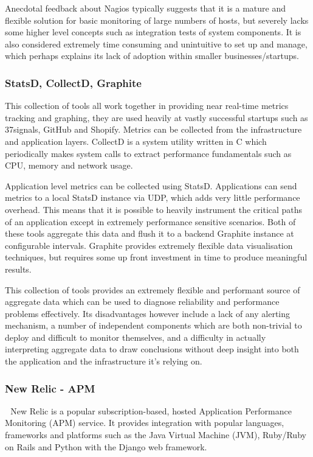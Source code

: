 \documentclass{cshonours}
\begin{document}
Anecdotal feedback about Nagios typically suggests that it is a mature and flexible solution for basic monitoring of large numbers of hosts, but severely lacks some higher level concepts such as integration tests of system components. It is also considered extremely time consuming and unintuitive to set up and manage, which perhaps explains its lack of adoption within smaller businesses/startups.

\subsubsection{StatsD, CollectD, Graphite}

This collection of tools all work together in providing near real-time metrics tracking and graphing, they are used heavily at vastly successful startups such as 37signals, GitHub and Shopify. Metrics can be collected from the infrastructure and application layers. 
CollectD is a system utility written in C which periodically makes system calls to extract performance fundamentals such as CPU, memory and network usage. 

Application level metrics can be collected using StatsD. Applications can send metrics to a local StatsD instance via UDP, which adds very little performance overhead. This means that it is possible to heavily instrument the critical paths of an application except in extremely performance sensitive scenarios. Both of these tools aggregate this data and flush it to a backend Graphite instance at configurable intervals. Graphite provides extremely flexible data visualisation techniques, but requires some up front investment in time to produce meaningful results.

This collection of tools provides an extremely flexible and performant source of aggregate data which can be used to diagnose reliability and performance problems effectively. Its disadvantages however include a lack of any alerting mechanism, a number of independent components which are both non-trivial to deploy and difficult to monitor themselves, and a difficulty in actually interpreting aggregate data to draw conclusions without deep insight into both the application and the infrastructure it’s relying on.

\subsubsection{New Relic - APM} 
New Relic is a popular subscription-based, hosted Application Performance Monitoring (APM) service. It provides integration with popular languages, frameworks and platforms such as the Java Virtual Machine (JVM), Ruby/Ruby on Rails and Python with the Django web framework.
\end{document}
